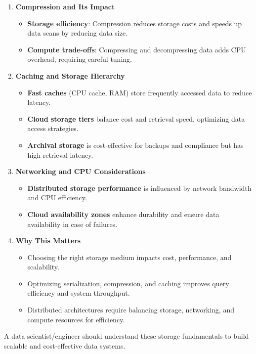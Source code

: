 \begin{enumerate}
    \item \textbf{Compression and Its Impact}
    \begin{itemize}
        \item \textbf{Storage efficiency}: Compression reduces storage costs and speeds up data scans by reducing data size.
        \item \textbf{Compute trade-offs}: Compressing and decompressing data adds CPU overhead, requiring careful tuning.
    \end{itemize}
    
    \item \textbf{Caching and Storage Hierarchy}
    \begin{itemize}
        \item \textbf{Fast caches} (CPU cache, RAM) store frequently accessed data to reduce latency.
        \item \textbf{Cloud storage tiers} balance cost and retrieval speed, optimizing data access strategies.
        \item \textbf{Archival storage} is cost-effective for backups and compliance but has high retrieval latency.
    \end{itemize}
    
    \item \textbf{Networking and CPU Considerations}
    \begin{itemize}
        \item \textbf{Distributed storage performance} is influenced by network bandwidth and CPU efficiency.
        \item \textbf{Cloud availability zones} enhance durability and ensure data availability in case of failures.
    \end{itemize}
    
    \item \textbf{Why This Matters}
    \begin{itemize}
        \item Choosing the right storage medium impacts cost, performance, and scalability.
        \item Optimizing serialization, compression, and caching improves query efficiency and system throughput.
        \item Distributed architectures require balancing storage, networking, and compute resources for efficiency.
    \end{itemize}
\end{enumerate}

A data scientist/engineer should understand these storage fundamentals to build scalable and cost-effective data systems.




